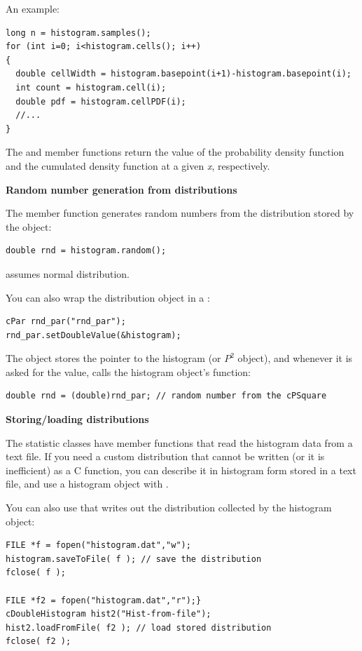 An example:

\begin{Verbatim}
long n = histogram.samples();
for (int i=0; i<histogram.cells(); i++)
{
  double cellWidth = histogram.basepoint(i+1)-histogram.basepoint(i); 
  int count = histogram.cell(i);
  double pdf = histogram.cellPDF(i);
  //...
}
\end{Verbatim}


The  and  member functions
return the value of the probability density function and the cumulated
density function at a given \textit{x}, respectively.


\textbf{Random number generation from distributions}


The  member function generates random
numbers from the distribution stored by the
object:

\begin{Verbatim}
double rnd = histogram.random();
\end{Verbatim}


 assumes normal distribution.

You can also wrap the distribution object in a :

\begin{Verbatim}
cPar rnd_par("rnd_par");
rnd_par.setDoubleValue(&histogram);
\end{Verbatim}


The  object stores the pointer to the histogram (or $P^{2}$ object), 
and whenever it is asked for the value, calls the histogram object's  
function:

\begin{Verbatim}
double rnd = (double)rnd_par; // random number from the cPSquare
\end{Verbatim}

\textbf{Storing/loading distributions}


The statistic classes have  member functions
that read the histogram data from a text file. If you need a custom
distribution that cannot be written (or it
is inefficient) as a C function, you can describe it in histogram form
stored in a text file, and use a histogram object with
.

You can also use that writes out the distribution 
collected by the histogram object:

\begin{Verbatim}
FILE *f = fopen("histogram.dat","w");
histogram.saveToFile( f ); // save the distribution
fclose( f );

FILE *f2 = fopen("histogram.dat","r");}
cDoubleHistogram hist2("Hist-from-file");
hist2.loadFromFile( f2 ); // load stored distribution
fclose( f2 );
\end{Verbatim}


